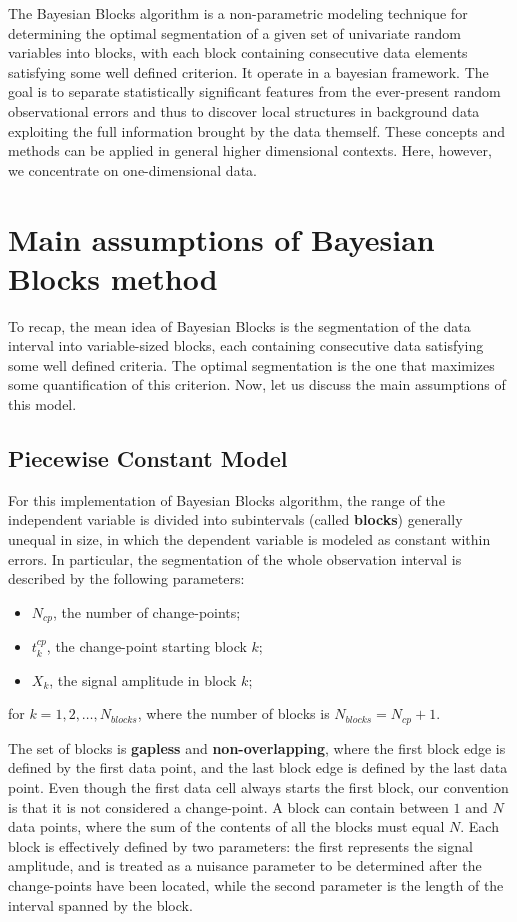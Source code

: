 \documentclass[prb,twocolumn]{revtex4-1}
\begin{document}
The Bayesian Blocks algorithm is a non-parametric modeling technique for determining the optimal segmentation of a given set of univariate random variables into blocks, with each block containing consecutive data elements satisfying some well defined criterion. It operate in a bayesian framework.
The goal is to separate statistically significant features from the ever-present random observational errors and thus to discover local structures in background data exploiting the full information brought by the data themself.
These concepts and methods can be applied in general higher dimensional contexts. Here, however, we concentrate on one-dimensional data.

\section{Main assumptions of Bayesian Blocks method}

To recap, the mean idea of Bayesian Blocks is the segmentation of the data interval into variable-sized blocks, each containing consecutive data satisfying some well defined criteria. The optimal segmentation is the one that maximizes some quantification of this criterion. 
Now, let us discuss the main assumptions of this model.

\subsection{Piecewise Constant Model}

For this implementation of Bayesian Blocks algorithm, the range of the independent variable is divided into subintervals (called \textbf{blocks}) generally unequal in size, in which the dependent variable is modeled as constant within errors. 
In particular, the segmentation of the whole observation interval is described by the following parameters:
\begin{itemize}
    \item $N_{cp}$, the number of change-points;
    \item $t_k^{cp}$, the change-point starting block $k$;
    \item $X_k$, the signal amplitude in block $k$;
\end{itemize}
for $k=1,2,\dots,N_{blocks}$, where the number of blocks is $N_{blocks}=N_{cp}+1$.

The set of blocks is \textbf{gapless} and \textbf{non-overlapping}, where the first block edge is defined by the first data point, and the last block edge is defined by the last data point. Even though the first data cell always starts the first block, our convention is that it is not considered a change-point.
A block can contain between $1$ and $N$ data points, where the sum of the contents of all the blocks must equal $N$.
Each block is effectively defined by two parameters: the first represents the signal amplitude, and is treated as a nuisance parameter to be determined after the change-points have been located, while the second parameter is the length of the interval spanned by the block.
\end{document}
